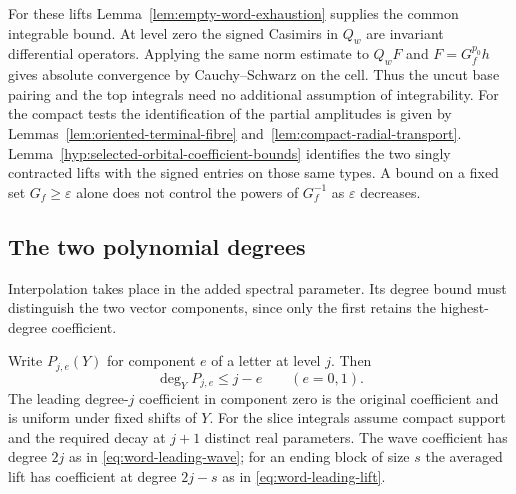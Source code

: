 For these lifts Lemma~\ref{lem:empty-word-exhaustion} supplies the common integrable bound. At level zero the signed Casimirs in \(Q_w\) are invariant differential operators. Applying the same norm estimate to \(Q_wF\) and \(F=G_f^{p_0}h\) gives absolute convergence by Cauchy--Schwarz on the cell. Thus the uncut base pairing and the top integrals need no additional assumption of integrability. For the compact tests the identification of the partial amplitudes is
given by Lemmas~\ref{lem:oriented-terminal-fibre}
and~\ref{lem:compact-radial-transport}. Lemma~\ref{hyp:selected-orbital-coefficient-bounds} identifies the two
singly contracted lifts with the signed entries on those same types. A bound on a fixed set \(G_f\ge\varepsilon\) alone does not control the powers of \(G_f^{-1}\) as \(\varepsilon\) decreases.

\subsection{The two polynomial degrees}

Interpolation takes place in the added spectral parameter. Its degree bound must distinguish the two vector components, since only the first retains the highest-degree coefficient.

\begin{proposition}\label{prop:letter-polynomial-degree}
Write \(P_{j,e}(Y)\) for component \(e\) of a letter at level \(j\). Then 
\[
 \deg_Y P_{j,e}\le j-e\qquad(e=0,1).
\]
 The leading degree-\(j\)
coefficient in component zero is the original coefficient and
is uniform under fixed shifts of \(Y\). For the slice integrals assume compact support and the required
decay at \(j+1\) distinct real parameters. The wave coefficient
has degree \(2j\) as in \eqref{eq:word-leading-wave}; for an ending
block of size \(s\) the averaged lift has coefficient at degree \(2j-s\)
as in \eqref{eq:word-leading-lift}.
\end{proposition}

